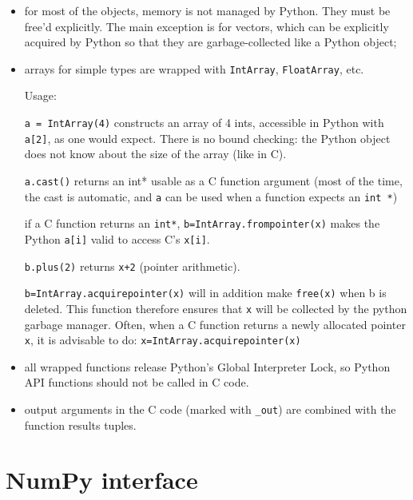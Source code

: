 \documentclass[a4paper,11pt,notitlepage,final,twoside]{report}
\newcommand{\tc}[1]{\texttt{#1}}
\begin{document}
\begin{itemize}
\item for most of the objects, memory is not managed by Python. They must be free'd explicitly. The main exception is for vectors, which can be explicitly acquired by Python so that they are garbage-collected like a Python object;
\item arrays for simple types are wrapped with \tc{IntArray}, \tc{FloatArray}, etc. 

  Usage:

      \tc{a = IntArray(4)} constructs an array of 4 ints, accessible in Python with \tc{a[2]}, as one would expect. There is no bound checking: the Python object does not know about the size of the array (like in C).

      \tc{a.cast()} returns an int* usable as a C function argument (most of the time, the cast is automatic, and \tc{a} can be used when a function expects an \tc{int *})
      
      if a C function returns an \tc{int*}, \tc{b=IntArray.frompointer(x)} makes the Python \tc{a[i]} valid to access C's \tc{x[i]}.

      \tc{b.plus(2)} returns \tc{x+2} (pointer arithmetic).

      \tc{b=IntArray.acquirepointer(x)} will in addition make \tc{free(x)} when b is deleted. This function therefore ensures that \tc{x} will be collected 
by the python garbage manager. Often, when a C function returns a newly allocated pointer \tc{x}, it is advisable to do: \tc{x=IntArray.acquirepointer(x)}


\item all wrapped functions release Python's Global Interpreter Lock, so Python API functions should not be called in C code.

\item output arguments in the C code (marked with \tc{\_out}) are combined with the function results tuples. 
\end{itemize}


\section{NumPy interface}
\end{document}
